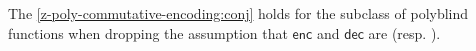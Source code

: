 \begin{lemma}
    \label{z-poly-commutative-encoding:remark}
    The \cref{z-poly-commutative-encoding:conj} holds for the
    subclass of polyblind functions when dropping the assumption that
    $\mathsf{enc}$ and $\mathsf{dec}$ are 
    (resp. ).
\end{lemma}
